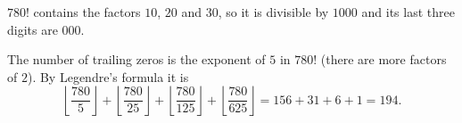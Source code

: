 $780!$ contains the factors $10$, $20$ and $30$, so it is divisible by $1000$ and its last three digits are $\boxed{000}$.

The number of trailing zeros is the exponent of $5$ in $780!$ (there are more factors of $2$). By Legendre's formula it is
\[
\left\lfloor\dfrac{780}{5}\right\rfloor+\left\lfloor\dfrac{780}{25}\right\rfloor+\left\lfloor\dfrac{780}{125}\right\rfloor+\left\lfloor\dfrac{780}{625}\right\rfloor=156+31+6+1=\boxed{194}.
\]
